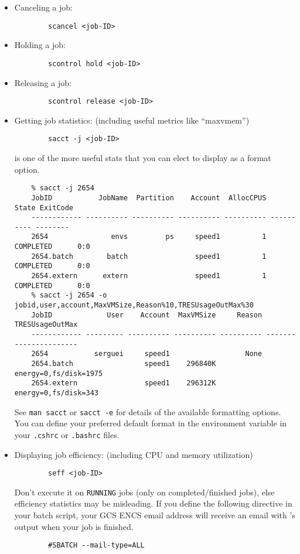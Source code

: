 \begin{itemize}
	\item Canceling a job:
	\begin{verbatim}
		scancel <job-ID>
	\end{verbatim}

	\item Holding a job:
	\begin{verbatim}
		scontrol hold <job-ID>
	\end{verbatim}

	\item Releasing a job:
	\begin{verbatim}
		scontrol release <job-ID>
	\end{verbatim}

	\item Getting job statistics: (including useful metrics like ``maxvmem'')
	\begin{verbatim}
		sacct -j <job-ID>
	\end{verbatim}
     is one of the more useful stats that you can elect to display as a format option.

    \small
	\begin{verbatim}
	% sacct -j 2654
	JobID           JobName  Partition    Account  AllocCPUS      State ExitCode
	------------ ---------- ---------- ---------- ---------- ---------- --------
	2654               envs         ps     speed1          1  COMPLETED      0:0
	2654.batch        batch                speed1          1  COMPLETED      0:0
	2654.extern      extern                speed1          1  COMPLETED      0:0
	% sacct -j 2654 -o jobid,user,account,MaxVMSize,Reason%10,TRESUsageOutMax%30
	JobID             User    Account  MaxVMSize     Reason        TRESUsageOutMax
	------------ --------- ---------- ---------- ---------- ----------------------
	2654           serguei     speed1                  None
	2654.batch                 speed1    296840K             energy=0,fs/disk=1975
	2654.extern                speed1    296312K              energy=0,fs/disk=343
	\end{verbatim}
    \normalsize

	See \texttt{man sacct} or \texttt{sacct -e} for details of the available formatting options.
	You can define your preferred default format in the  environment variable
	in your \texttt{.cshrc} or \texttt{.bashrc} files.

	\item Displaying job efficiency: (including CPU and memory utilization)
	\begin{verbatim}
	    seff <job-ID>
	\end{verbatim}
    Don't execute it on \texttt{RUNNING} jobs (only on completed/finished jobs), else
	efficiency statistics may be misleading. If you define the following directive in your batch script,
    your GCS ENCS email address will receive an email with 's output when your job is finished.
	\begin{verbatim}
	    #SBATCH --mail-type=ALL
	\end{verbatim}


\end{itemize}
